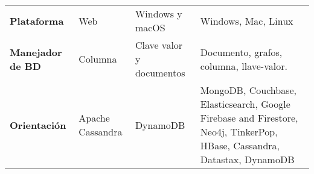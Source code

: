 \begin{longtable}{  p{3cm}| p{4cm}| p{4cm}| p{4cm} }
		\textbf{Plataforma } & Web & Windows y macOS & Windows, Mac, Linux \\
		
		\textbf{Manejador de BD } & Columna & Clave valor y documentos & Documento, grafos, columna, llave-valor.\\
		
		\textbf{Orientación } & Apache Cassandra & DynamoDB & MongoDB, Couchbase, Elasticsearch, Google Firebase and Firestore, Neo4j, TinkerPop, HBase, Cassandra, Datastax, DynamoDB
		 \\
		
	\end{longtable}
